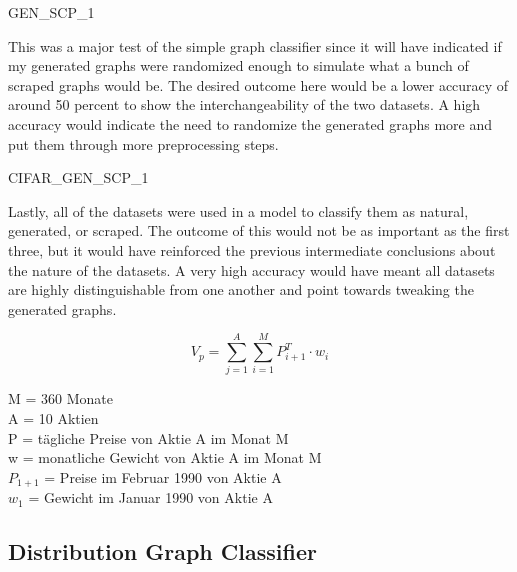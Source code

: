 \documentclass[12pt]{article}
\begin{document}
            GEN\_SCP\_1
            
            This was a major test of the simple graph classifier 
            since it will have indicated if my generated graphs were randomized enough to simulate what a bunch of scraped graphs would be. 
            The desired outcome here would be a lower accuracy of around 50 percent to show the interchangeability of the two datasets. 
            A high accuracy would indicate the need to randomize the generated graphs more and put them through more preprocessing steps.
            
            CIFAR\_GEN\_SCP\_1
            
            Lastly, all of the datasets were used in a model to classify them as natural, generated, or scraped. 
            The outcome of this would not be as important as the first three, 
            but it would have reinforced the previous intermediate conclusions about the nature of the datasets. 
            A very high accuracy would have meant all datasets are highly distinguishable from one another 
            and point towards tweaking the generated graphs.
            

            \newpage
            \begin{Large} \[ V_p = \sum_{j=1}^{A}\sum_{i=1}^{M}P^T_{i+1} \cdot w_i \] \end{Large}

            \begin{multicols}{2}
                \begin{footnotesize}
                    
                    \noindent M = 360 Monate \\
                    A = 10 Aktien \\
                    P = tägliche Preise von Aktie A im Monat M \\
                    w = monatliche Gewicht von Aktie A im Monat M \\
                    $P_{1+1}$ = Preise im Februar 1990 von Aktie A \\
                    $w_1$ = Gewicht im Januar 1990 von Aktie A 

                \end{footnotesize}
            \end{multicols}

        \subsection{Distribution Graph Classifier}
\end{document}
